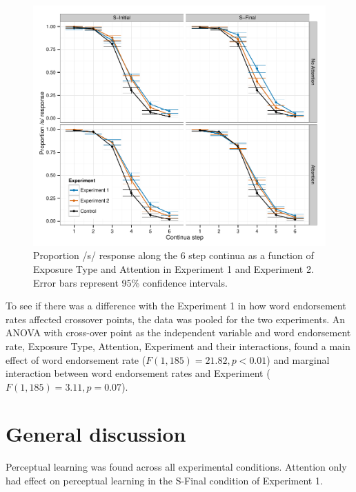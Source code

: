 \begin{figure}[!ht]
\caption{Proportion /s/ response along the 6 step continua as a function of Exposure Type and Attention in Experiment 1 and Experiment 2. Error bars represent 95\% confidence intervals.}
\label{fig:exp12categ}
\begin{center}
\includegraphics[width=\textwidth]{graphs/exp12_categresults}
\end{center}
\end{figure}

To see if there was a difference with the Experiment 1 in how word endorsement rates affected crossover points, the data was pooled for the two experiments.  
An ANOVA with cross-over point as the independent variable and word endorsement rate, Exposure Type, Attention, Experiment and their interactions, found a main effect of word endorsement rate ($F(1,185) = 21.82, p < 0.01$) and marginal interaction between word endorsement rates and Experiment ($F(1, 185) = 3.11, p = 0.07$).

\section{General discussion}

Perceptual learning was found across all experimental conditions. Attention only had effect on perceptual learning in the S-Final condition of Experiment 1.  


